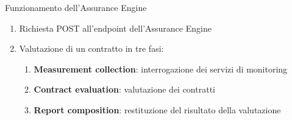 \begin{frame}{Funzionamento dell'Assurance Engine}

  \begin{enumerate}
    \item \alert{Richiesta} POST all'endpoint dell'Assurance Engine
    
    \item Valutazione di un contratto in \alert{tre fasi}:
    
    \begin{enumerate}
      \item \textbf{Measurement collection}: interrogazione dei \alert{servizi di monitoring} %
      
      \item \textbf{Contract evaluation}: valutazione dei \alert{contratti} 
      
      \item \textbf{Report composition}: restituzione del \alert{risultato} della valutazione %
    \end{enumerate}
  \end{enumerate}
\end{frame}

